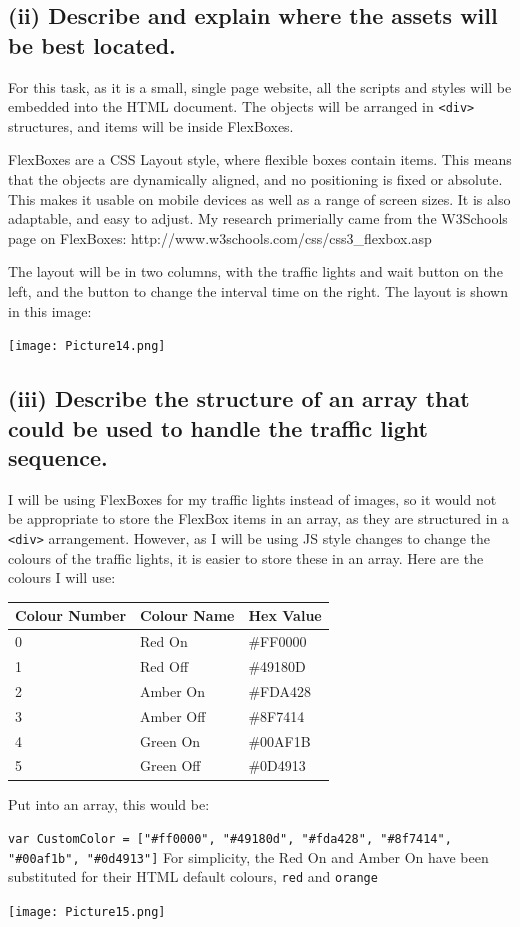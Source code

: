 \documentclass[a4paper]{article}
\begin{document}
\subsection{(ii) Describe and explain where the assets will be best located.}
For this task, as it is a small, single page website, all the scripts and styles will be embedded into the HTML document. The objects will be arranged in \verb|<div>| structures, and items will be inside FlexBoxes. \par
FlexBoxes are a CSS Layout style, where flexible boxes contain items. This means that the objects are dynamically aligned, and no positioning is fixed or absolute. This makes it usable on mobile devices as well as a range of screen sizes. It is also adaptable, and easy to adjust. My research primerially came from the W3Schools page on FlexBoxes: http://www.w3schools.com/css/css3\_flexbox.asp \par
The layout will be in two columns, with the traffic lights and wait button on the left, and the button to change the interval time on the right. The layout is shown in this image: \par
\noindent\texttt{[image: Picture14.png]}
\subsection{(iii) Describe the structure of an array that could be used to handle the traffic light sequence.}
I will be using FlexBoxes for my traffic lights instead of images, so it would not be appropriate to store the FlexBox items in an array, as they are structured in a \verb|<div>| arrangement. However, as I will be using JS style changes to change the colours of the traffic lights, it is easier to store these in an array. Here are the colours I will use:
\begin{center}
\begin{tabular}{ | m{7em} | m{7em} | m{7em} | }
  \hline
  Colour Number & Colour Name & Hex Value \\ [0.5ex] 
  \hline \hline	
  0 & Red On & \cellcolor[HTML]{FF0000} \#FF0000 \\
  \hline
  1 & Red Off & \cellcolor[HTML]{49180D} \color{white} \#49180D \\
  \hline
  2 & Amber On & \cellcolor[HTML]{FDA428} \#FDA428 \\
  \hline
  3 & Amber Off & \cellcolor[HTML]{8F7414} \color{white} \#8F7414 \\
  \hline
  4 & Green On & \cellcolor[HTML]{00AF1B} \#00AF1B \\
  \hline
  5 & Green Off & \cellcolor[HTML]{0d4913} \color{white} \#0D4913 \\
  \hline
\end{tabular}
\end{center}
Put into an array, this would be: \par
\verb|var CustomColor = ["#ff0000", "#49180d", "#fda428", "#8f7414", "#00af1b", "#0d4913"]|
For simplicity, the Red On and Amber On have been substituted for their HTML default colours, \verb|red| and \verb|orange| \par
\noindent\texttt{[image: Picture15.png]}
\end{document}
